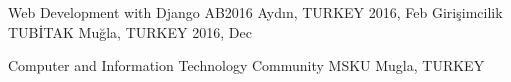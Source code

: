 \begin{cvhonors}
    \cvhonor
        {Web Development with Django}
        {AB2016}
        {Aydın, TURKEY}
        {2016, Feb}
    \cvhonor
        {Girişimcilik}
        {TUBİTAK}
        {Muğla, TURKEY}
        {2016, Dec}
\end{cvhonors}

\begin{cvhonors}
    \cvhonor
        {Computer and Information Technology Community}
        {MSKU}
        {Mugla, TURKEY}
        {}

\end{cvhonors}